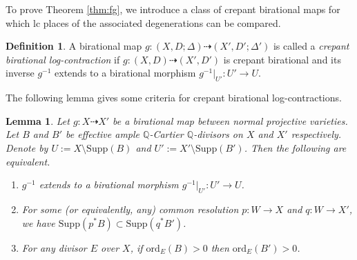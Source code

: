\documentclass[reqno, 12pt]{amsart}
\newtheorem{lem}[prop]{Lemma}
\theoremstyle{definition}
\newtheorem{defn}[prop]{Definition}
\newcommand{\bQ}{\mathbb{Q}}
\newcommand{\Supp}{\mathrm{Supp}}
\newcommand{\ord}{\mathrm{ord}}
\numberwithin{equation}{section}
\begin{document}
To prove Theorem \ref{thm:fg}, we introduce a class of crepant birational maps for which lc places of the associated degenerations can be compared.

\begin{defn}
 A birational map $g:(X,D;\Delta)\dashrightarrow (X',D';\Delta')$ is called a \emph{crepant birational log-contraction} if $g:(X,D)\dashrightarrow (X',D')$ is crepant birational and 
 its inverse $g^{-1}$ extends to a birational morphism $g^{-1}|_{U'}: U'\to U$. 
\end{defn}

The following lemma gives some criteria for crepant birational log-contractions.

\begin{lem}\label{lem:log-cont}
Let $g: X\dashrightarrow X'$ be a birational map between normal projective varieties. Let $B$ and $B'$ be effective ample $\bQ$-Cartier $\bQ$-divisors on $X$ and $X'$ respectively. Denote by $U:= X\setminus \Supp(B)$ and $U':= X'\setminus \Supp(B')$. Then the following are equivalent.
\begin{enumerate}
    \item $g^{-1}$ extends to a birational morphism $g^{-1}|_{U'}: U'\to U$.
    \item For some (or equivalently, any) common resolution $p: W\to X$ and $q: W\to X'$, we have $\Supp(p^*B)\subset \Supp(q^* B')$.
    \item For any divisor $E$ over $X$, if $\ord_E(B)>0$ then $\ord_E(B')>0$.
\end{enumerate}
\end{lem}
\end{document}
